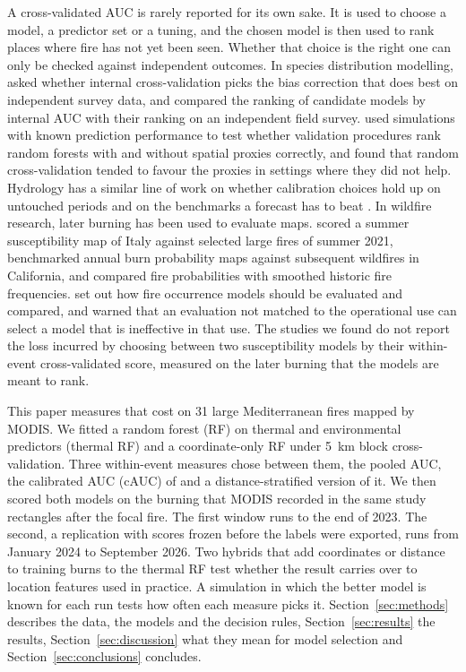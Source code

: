 \documentclass[preprint,12pt,authoryear]{elsarticle}
\begin{document}
A cross-validated AUC is rarely reported for its own sake. It is used to choose a model, a predictor set or a tuning, and the chosen model is then used to rank places where fire has not yet been seen. Whether that choice is the right one can only be checked against independent outcomes. In species distribution modelling, \citet{Baker2024} asked whether internal cross-validation picks the bias correction that does best on independent survey data, and \citet{Finn2024} compared the ranking of candidate models by internal AUC with their ranking on an independent field survey. \citet{Mila2024} used simulations with known prediction performance to test whether validation procedures rank random forests with and without spatial proxies correctly, and found that random cross-validation tended to favour the proxies in settings where they did not help. Hydrology has a similar line of work on whether calibration choices hold up on untouched periods \citep{Arsenault2018} and on the benchmarks a forecast has to beat \citep{Pappenberger2015}. In wildfire research, later burning has been used to evaluate maps. \citet{Trucchia2022} scored a summer susceptibility map of Italy against selected large fires of summer 2021, \citet{Moran2025} benchmarked annual burn probability maps against subsequent wildfires in California, and \citet{Preisler2008} compared fire probabilities with smoothed historic fire frequencies. \citet{PhelpsWoolford2021} set out how fire occurrence models should be evaluated and compared, and warned that an evaluation not matched to the operational use can select a model that is ineffective in that use. The studies we found do not report the loss incurred by choosing between two susceptibility models by their within-event cross-validated score, measured on the later burning that the models are meant to rank.

This paper measures that cost on 31 large Mediterranean fires mapped by MODIS. We fitted a random forest (RF) on thermal and environmental predictors (thermal RF) and a coordinate-only RF under 5~km block cross-validation. Three within-event measures chose between them, the pooled AUC, the calibrated AUC (cAUC) of \citet{Hijmans2012} and a distance-stratified version of it. We then scored both models on the burning that MODIS recorded in the same study rectangles after the focal fire. The first window runs to the end of 2023. The second, a replication with scores frozen before the labels were exported, runs from January 2024 to September 2026. Two hybrids that add coordinates or distance to training burns to the thermal RF test whether the result carries over to location features used in practice. A simulation in which the better model is known for each run tests how often each measure picks it. Section~\ref{sec:methods} describes the data, the models and the decision rules, Section~\ref{sec:results} the results, Section~\ref{sec:discussion} what they mean for model selection and Section~\ref{sec:conclusions} concludes.
\end{document}
